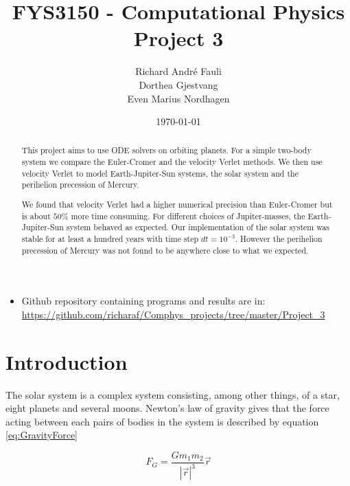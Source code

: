 \documentclass[norsk,a4paper,12pt]{article}
\title{FYS3150 - Computational Physics\\\vspace{2mm} \Large{Project 3}}
\author{\large Richard Andr\'e Fauli\\ Dorthea Gjestvang\\ Even Marius Nordhagen}
\date{\today}
\begin{document}
\maketitle
\begin{abstract}
This project aims to use ODE solvers on orbiting planets. For a simple two-body system we compare the Euler-Cromer and the velocity Verlet methods. We then use velocity Verlet to model Earth-Jupiter-Sun systems, the solar system and the perihelion precession of Mercury.

We found that velocity Verlet had a higher numerical precision than Euler-Cromer but is about $50\%$ more time consuming. For different choices of Jupiter-masses, the Earth-Jupiter-Sun system behaved as expected. Our implementation of the solar system was stable for at least a hundred years with time step $dt=10^{-3}$. However the perihelion precession of Mercury was not found to be anywhere close to what we expected.\end{abstract}
\begin{itemize}
\item Github repository containing programs and results are in: \url{https://github.com/richaraf/Comphys_projects/tree/master/Project_3}
\end{itemize}
\section{Introduction}
The solar system is a complex system consisting, among other things, of a star, eight planets and several moons. Newton's law of gravity gives that the force acting between each pairs of bodies in the system is described by equation \ref{eq:GravityForce}

\begin{equation}
    F_G = \frac{G m_1 m_2}{|\vec{r}|^3}\vec{r}
    \label{eq:GravityForce}
\end{equation}
\end{document}
